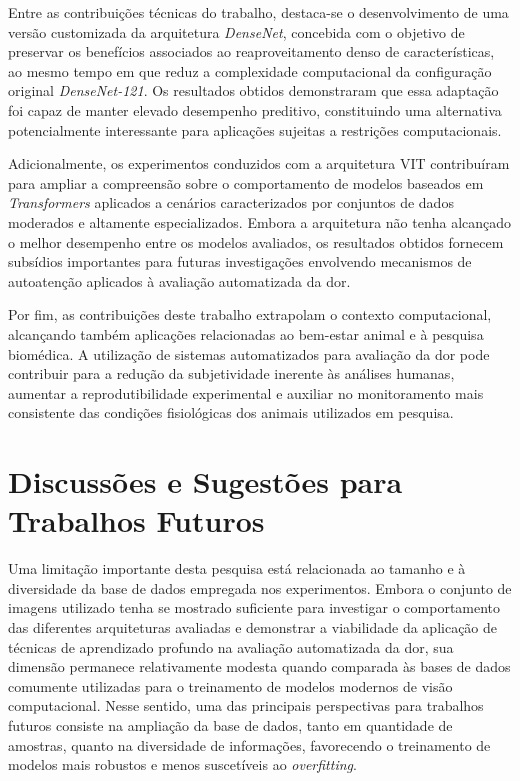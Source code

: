 Entre as contribuições técnicas do trabalho, destaca-se o desenvolvimento de uma versão customizada da arquitetura \textit{DenseNet}, concebida com o objetivo de preservar os benefícios associados ao reaproveitamento denso de características, ao mesmo tempo em que reduz a complexidade computacional da configuração original \textit{DenseNet-121}. Os resultados obtidos demonstraram que essa adaptação foi capaz de manter elevado desempenho preditivo, constituindo uma alternativa potencialmente interessante para aplicações sujeitas a restrições computacionais.

Adicionalmente, os experimentos conduzidos com a arquitetura \acs{VIT} contribuíram para ampliar a compreensão sobre o comportamento de modelos baseados em \textit{Transformers} aplicados a cenários caracterizados por conjuntos de dados moderados e altamente especializados. Embora a arquitetura não tenha alcançado o melhor desempenho entre os modelos avaliados, os resultados obtidos fornecem subsídios importantes para futuras investigações envolvendo mecanismos de autoatenção aplicados à avaliação automatizada da dor.

Por fim, as contribuições deste trabalho extrapolam o contexto computacional, alcançando também aplicações relacionadas ao bem-estar animal e à pesquisa biomédica. A utilização de sistemas automatizados para avaliação da dor pode contribuir para a redução da subjetividade inerente às análises humanas, aumentar a reprodutibilidade experimental e auxiliar no monitoramento mais consistente das condições fisiológicas dos animais utilizados em pesquisa.


\section{Discussões e Sugestões para Trabalhos Futuros}

Uma limitação importante desta pesquisa está relacionada ao tamanho e à diversidade da base de dados empregada nos experimentos. Embora o conjunto de imagens utilizado tenha se mostrado suficiente para investigar o comportamento das diferentes arquiteturas avaliadas e demonstrar a viabilidade da aplicação de técnicas de aprendizado profundo na avaliação automatizada da dor, sua dimensão permanece relativamente modesta quando comparada às bases de dados comumente utilizadas para o treinamento de modelos modernos de visão computacional. Nesse sentido, uma das principais perspectivas para trabalhos futuros consiste na ampliação da base de dados, tanto em quantidade de amostras, quanto na diversidade de informações, favorecendo o treinamento de modelos mais robustos e menos suscetíveis ao \textit{overfitting}. 

